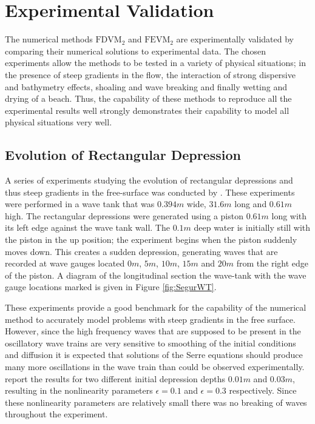 
\chapter{Experimental Validation}
\label{chp:ExpMethodComp}

The numerical methods $\text{FDVM}_2$ and $\text{FEVM}_2$ are experimentally validated by comparing their numerical solutions to experimental data. The chosen experiments allow the methods to be tested in a variety of physical situations; in the presence of steep gradients in the flow, the interaction of strong dispersive and bathymetry effects, shoaling and wave breaking and finally wetting and drying of a beach. Thus, the capability of these methods to reproduce all the experimental results well strongly demonstrates their capability to model all physical situations very well. 

\section{Evolution of Rectangular Depression}
A series of experiments studying the evolution of rectangular depressions and thus steep gradients in the free-surface was conducted by \citet{Hammack-Segur-1978-337}. These experiments were performed in a wave tank that was $0.394m$ wide, $31.6m$ long and $0.61m$ high. The rectangular depressions were generated using a piston $0.61m$ long with its left edge against the wave tank wall. The $0.1m$ deep water is initially still with the piston in the up position; the experiment begins when the piston suddenly moves down. This creates a sudden depression, generating waves that are recorded at wave gauges located $0m$, $5m$, $10m$, $15m$ and $20m$ from the right edge of the piston. A diagram of the longitudinal section the wave-tank with the wave gauge locations marked is given in Figure \ref{fig:SegurWT}. 

These experiments provide a good benchmark for the capability of the numerical method to accurately model problems with steep gradients in the free surface. However, since the high frequency waves that are supposed to be present in the oscillatory wave trains are very sensitive to smoothing of the initial conditions and diffusion \cite{Pitt-2018-61} it is expected that solutions of the Serre equations should produce many more oscillations in the wave train than could be observed experimentally. \citet{Hammack-Segur-1978-337} report the results for two different initial depression depths $0.01m$ and $0.03m$, resulting in the nonlinearity parameters $\epsilon = 0.1$ and $\epsilon=0.3$ respectively. Since these nonlinearity parameters are relatively small there was no breaking of waves throughout the experiment. 

